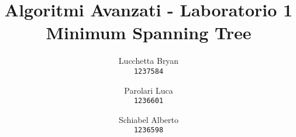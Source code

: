 \author{
  Lucchetta Bryan\\
  \texttt{1237584}
  \and
  Parolari Luca\\
  \texttt{1236601}
  \and
  Schiabel Alberto\\
  \texttt{1236598}
}

\title{Algoritmi Avanzati - Laboratorio 1 \\
  \large Minimum Spanning Tree}

\maketitle

\setcounter{tocdepth}{2}
{
  \hypersetup{linkcolor=black}
  \tableofcontents
  \newpage
  \listoffigures
  \listoftables
}
\protect\pagebreak[2]

